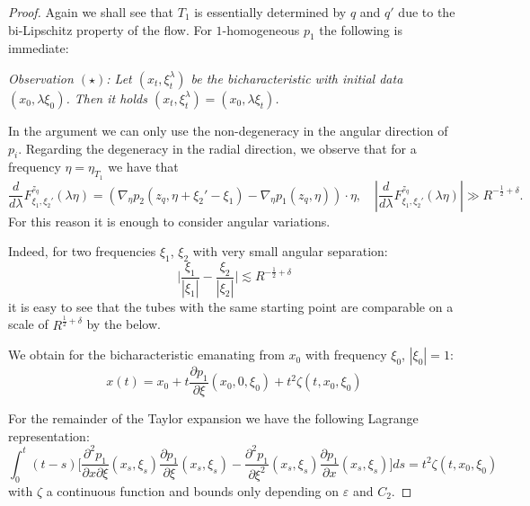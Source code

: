 \documentclass{amsart}
\theoremstyle{definition}
\begin{document}
\begin{proof}
Again we shall see that $T_1$ is essentially determined by $q$ and $q'$ due to the bi-Lipschitz property of the flow. For $1$-homogeneous $p_1$ the following is immediate: 

\smallskip

\emph{Observation $(\star)$: Let $(x_t,\xi^\lambda_t)$ be the bicharacteristic with initial data $(x_0,\lambda \xi_0)$. Then it holds $(x_t,\xi^\lambda_t) = (x_0, \lambda \xi_t)$.}

\smallskip

In the argument we can only use the non-degeneracy in the angular direction of $p_i$. Regarding the degeneracy in the radial direction, we observe that for a frequency $\eta = \eta_{T_1}$ we have that
\begin{equation*}
\frac{d}{d\lambda} F^{z_q}_{\xi_1,\xi_2'}(\lambda \eta) = (\nabla_{\eta} p_2(z_q,\eta + \xi_2'-\xi_1) - \nabla_{\eta} p_1(z_q,\eta)) \cdot \eta, \quad |\frac{d}{d\lambda} F^{z_q}_{\xi_1,\xi_2'}(\lambda \eta)| \gg R^{-\frac{1}{2}+\delta}.
\end{equation*}
For this reason it is enough to consider angular variations.

 Indeed, for two frequencies $\xi_1$, $\xi_2$ with very small angular separation:
\begin{equation*}
\big| \frac{\xi_1}{|\xi_1|} - \frac{\xi_2}{|\xi_2|} \big| \lesssim R^{-\frac{1}{2}+\delta}
\end{equation*}
it is easy to see that the tubes with the same starting point are comparable on a scale of $R^{\frac{1}{2}+\delta}$ by the below.

We obtain for the bicharacteristic emanating from $x_0$ with frequency $\xi_0$, $| \xi_0 | = 1$:
\begin{equation*}
x(t) = x_0 + t \frac{\partial p_1}{\partial \xi}(x_0,0,\xi_0) + t^2 \zeta(t,x_0,\xi_0)
\end{equation*}

For the remainder of the Taylor expansion we have the following Lagrange representation:
\begin{equation*}
\int_0^t (t-s) \big[ \frac{\partial^2 p_1}{\partial x \partial \xi}(x_s,\xi_s) \frac{\partial p_1}{\partial \xi}(x_s,\xi_s) - \frac{\partial^2 p_1}{\partial \xi^2}(x_s,\xi_s) \frac{\partial p_1}{\partial x}(x_s,\xi_s) \big] ds = t^2 \zeta(t,x_0,\xi_0)
\end{equation*}
with $\zeta$ a continuous function and bounds only depending on $\varepsilon$ and $C_2$.


\end{proof}
\end{document}
